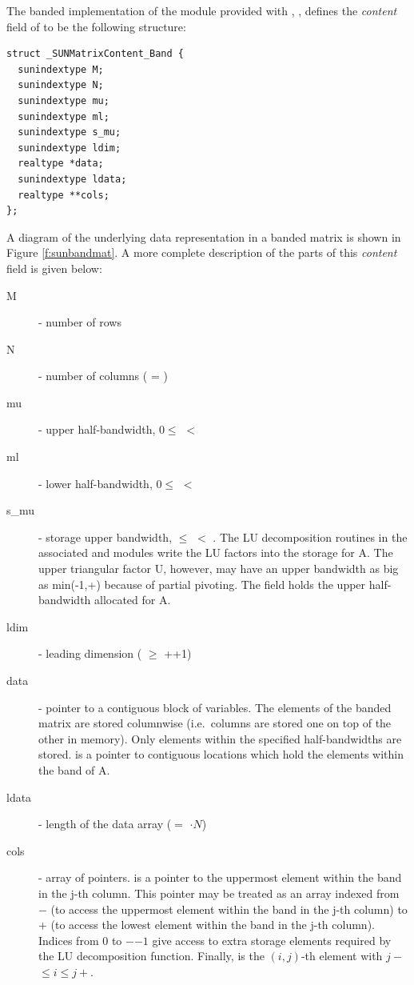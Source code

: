 
The banded implementation of the {\sunmatrix} module provided with
{\sundials}, {\sunmatband}, defines the {\em content} field
of  to be the following structure:
\begin{verbatim} 
struct _SUNMatrixContent_Band {
  sunindextype M;
  sunindextype N;
  sunindextype mu;
  sunindextype ml;
  sunindextype s_mu;
  sunindextype ldim;
  realtype *data;
  sunindextype ldata;
  realtype **cols;
};
\end{verbatim}
A diagram of the underlying data representation in a banded matrix is
shown in Figure \ref{f:sunbandmat}.  A more complete description of the
parts of this \emph{content} field is given below:
\begin{description}
  \item[M] - number of rows
  \item[N] - number of columns ( = )
  \item[mu] - upper half-bandwidth, $0 \le$  $<$ 
  \item[ml] - lower half-bandwidth, $0 \le$  $<$ 
  \item[s\_mu] - storage upper bandwidth,  $\le$  $<$ .
    The LU decomposition routines in the associated {\sunlinsolband}
    and {\sunlinsollapband} modules write the LU factors into the
    storage for A. The upper triangular factor U, however, may have  
    an upper bandwidth as big as min(-1,+) because of 
    partial pivoting. The  field holds the upper
  half-bandwidth allocated for A.
  \item[ldim] - leading dimension ( $\ge$ ++1)
  \item[data] - pointer to a contiguous block of  variables.
    The elements of the banded matrix are stored columnwise
    (i.e.~columns are stored one on top of the other in memory). Only
    elements within the specified half-bandwidths are stored.     
     is a pointer to  contiguous locations   
    which hold the elements within the band of A.  
  \item[ldata] - length of the data array
    ($=$ $\cdot N$) 
  \item[cols] - array of pointers.  is a pointer to the
    uppermost element within the band in the j-th column. This pointer
    may be treated as an array indexed from $-$ (to
    access the uppermost element within the band in the j-th column)
    to $+$ (to access the lowest element within the
    band in the j-th column). Indices from $0$ to
    $-$$-1$ give access to extra storage elements
    required by the LU decomposition function.
    Finally,  is the $(i,j)$-th element with
    $j-$ $\le i \le j+$.  
\end{description}

